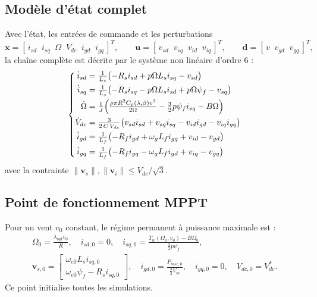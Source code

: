 \documentclass[11pt,a4paper]{article}
\theoremstyle{remark}
\newcommand{\vect}[1]{\bm{#1}}
\begin{document}
\subsection{Modèle d'état complet}
Avec l'état, les entrées de commande et les perturbations
\begin{equation}
  \vect{x} = [\,i_{sd}\;\; i_{sq}\;\; \Omega\;\; V_{dc}\;\; i_{gd}\;\; i_{gq}\,]^T, \qquad
  \vect{u} = [\,v_{sd}\;\; v_{sq}\;\; v_{id}\;\; v_{iq}\,]^T, \qquad
  \vect{d} = [\,v\;\; v_{gd}\;\; v_{gq}\,]^T,
\end{equation}
la chaîne complète est décrite par le système non linéaire d'ordre 6 :
\begin{equation}
\left\{
\begin{aligned}
  \dot i_{sd} &= \tfrac{1}{L_s}\bigl(-R_s i_{sd} + p\Omega L_s i_{sq} - v_{sd}\bigr)\\
  \dot i_{sq} &= \tfrac{1}{L_s}\bigl(-R_s i_{sq} - p\Omega L_s i_{sd} + p\Omega\psi_f - v_{sq}\bigr)\\
  \dot \Omega &= \tfrac{1}{J}\Bigl(\tfrac{\rho\pi R^2 C_p(\lambda,\beta) v^3}{2\Omega}
                 - \tfrac32 p\psi_f i_{sq} - B\Omega\Bigr)\\
  \dot V_{dc} &= \tfrac{3}{2\,C\,V_{dc}}\bigl(v_{sd}i_{sd} + v_{sq}i_{sq} - v_{id}i_{gd} - v_{iq}i_{gq}\bigr)\\
  \dot i_{gd} &= \tfrac{1}{L_f}\bigl(-R_f i_{gd} + \omega_g L_f i_{gq} + v_{id} - v_{gd}\bigr)\\
  \dot i_{gq} &= \tfrac{1}{L_f}\bigl(-R_f i_{gq} - \omega_g L_f i_{gd} + v_{iq} - v_{gq}\bigr)
\end{aligned}
\right.
\label{eq:modele_complet}
\end{equation}
avec la contrainte $\|\vect{v}_s\|,\|\vect{v}_i\|\le V_{dc}/\sqrt3$.

\subsection{Point de fonctionnement MPPT}
Pour un vent $v_0$ constant, le régime permanent à puissance maximale est :
\begin{equation}
\begin{gathered}
  \Omega_0 = \frac{\lambda_{opt} v_0}{R},\quad
  i_{sd,0}=0,\quad
  i_{sq,0} = \frac{T_w(\Omega_0,v_0) - B\Omega_0}{\tfrac32 p\psi_f},\\
  \vect{v}_{s,0} = \begin{bmatrix} \omega_{e0}L_s i_{sq,0}\\ \omega_{e0}\psi_f - R_s i_{sq,0}\end{bmatrix},\quad
  i_{gd,0} = \frac{P_{msc,0}}{\tfrac32 V_m},\quad i_{gq,0}=0,\quad V_{dc,0}=V_{dc}^*.
\end{gathered}
\end{equation}
Ce point initialise toutes les simulations.
\end{document}
